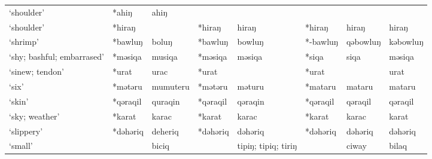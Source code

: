 \begin{landscape}
\begin{longtable}[c]{@{}p{3cm}<{\raggedright}p{2.75cm}<{\raggedright}p{2.75cm}<{\raggedright}p{2.75cm}<{\raggedright}p{2.75cm}<{\raggedright}p{2.75cm}<{\raggedright}p{2.75cm}<{\raggedright}p{2.75cm}<{\raggedright}@{}}
`shoulder'                                           & *ahiŋ              & ahiŋ                           &                    &                            &                  &                          &                                   \\
`shoulder'                                           & *hiraŋ             &                                & *hiraŋ             & hiraŋ                      & *hiraŋ           & hiraŋ                    & hiraŋ                             \\
`shrimp'                                             & *bawluŋ            & boluŋ                          & *bawluŋ            & bowluŋ                     & *-bawluŋ         & qəbowluŋ                 & kəbowluŋ                          \\
`shy; bashful; embarrased'                           & *məsiqa            & musiqa                         & *məsiqa            & məsiqa                     & *siqa            & siqa                     & məsiqa                            \\
`sinew; tendon'                                      & *urat              & urac                           & *urat              &                            & *urat            &                          & urat                              \\
`six'                                                & *mətəru            & mumuteru                       & *mətəru            & məturu                     & *mataru          & mataru                   & mataru                            \\
`skin'                                               & *qəraqil           & quraqin                        & *qəraqil           & qəraqin                    & *qəraqil         & qəraqil                  & qəraqil                           \\
`sky; weather'                                       & *karat             & karac                          & *karat             & karac                      & *karat           & karac                    & karat                             \\
`slippery'                                           & *dəhəriq           & deheriq                        & *dəhəriq           & dəhəriq                    & *dəhəriq         & dəhəriq                  & dəhəriq                           \\
`small'                                              &                    & biciq                          &                    & tipiŋ; tipiq; tiriŋ        &                  & ciway                    & bilaq                             \\

\end{longtable}
\end{landscape}
